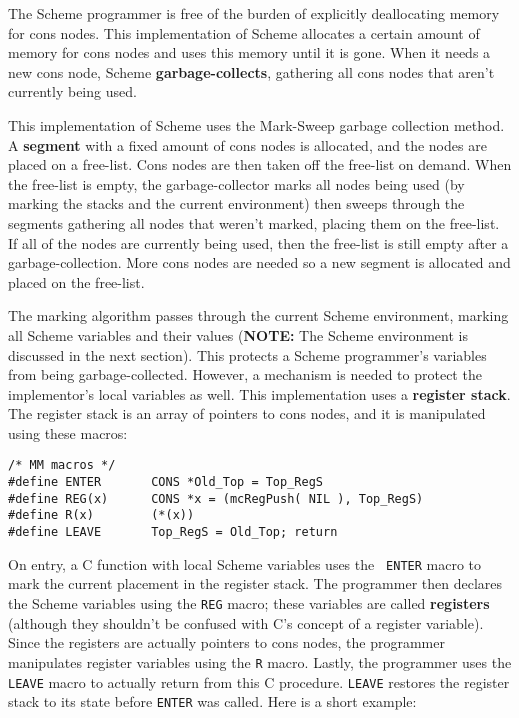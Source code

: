 	The Scheme programmer is free of the burden of explicitly
deallocating memory for cons nodes.  This implementation of Scheme
allocates a certain amount of memory for cons nodes and uses this memory
until it is gone.  When it needs a new cons node, Scheme {\bf
garbage-collects}, gathering all cons nodes that aren't currently being
used.

	This implementation of Scheme uses the Mark-Sweep garbage
collection method.  A {\bf segment} with a fixed amount of cons nodes is
allocated, and the nodes are placed on a free-list.  Cons nodes are then
taken off the free-list on demand.  When the free-list is empty, the
garbage-collector marks all nodes being used (by marking the stacks and
the current environment) then sweeps through the segments gathering all
nodes that weren't marked, placing them on the free-list.  If all of the
nodes are currently being used, then the free-list is still empty after a
garbage-collection.  More cons nodes are needed so a new segment is
allocated and placed on the free-list.

	The marking algorithm passes through the current Scheme
environment, marking all Scheme variables and their values ({\bf NOTE:}
The Scheme environment is discussed in the next section).  This protects a
Scheme programmer's variables from being garbage-collected.  However, a
mechanism is needed to protect the implementor's local variables as well.
This implementation uses a {\bf register stack}.  The register stack is an
array of pointers to cons nodes, and it is manipulated using these macros:

\begin{verbatim}
/* MM macros */
#define ENTER		CONS *Old_Top = Top_RegS
#define REG(x)		CONS *x = (mcRegPush( NIL ), Top_RegS)
#define R(x)		(*(x))
#define LEAVE		Top_RegS = Old_Top; return
\end{verbatim}

	On entry, a C function with local Scheme variables uses the {\tt
ENTER} macro to mark the current placement in the register stack.  The
programmer then declares the Scheme variables using the {\tt REG} macro;
these variables are called {\bf registers} (although they shouldn't be
confused with C's concept of a register variable).  Since the registers
are actually pointers to cons nodes, the programmer manipulates register
variables using the {\tt R} macro.  Lastly, the programmer uses the {\tt
LEAVE} macro to actually return from this C procedure.  {\tt LEAVE}
restores the register stack to its state before {\tt ENTER} was called.
Here is a short example:

